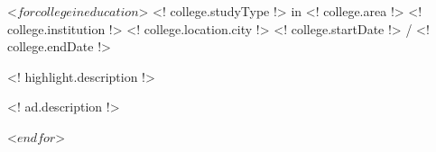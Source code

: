 \begin{cventries}
 <$ for college in education $>
  \cventry
    {<! college.studyType !> in <! college.area !>}
    {<! college.institution !>}
    {<! college.location.city !>}
    {<! college.startDate !> / <! college.endDate !>}
    {
          \begin{cvitems}
                \item{<! highlight.description !>}
                    \begin{cvitemssub}
                        \item{<! ad.description !>}
                    \end{cvitemssub}
          \end{cvitems}
    }
 <$ endfor $>
\end{cventries}
